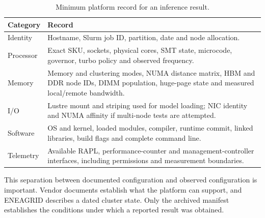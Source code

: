 \begin{table}[tbp]
\centering
\small
\caption{Minimum platform record for an inference result.}
\label{tab:platform-record}
\begin{tabularx}{\textwidth}{@{}lY@{}}
\toprule
\textbf{Category} & \textbf{Record} \\
\midrule
Identity
 & Hostname, Slurm job ID, partition, date and node allocation. \\
Processor
 & Exact SKU, sockets, physical cores, SMT state, microcode, governor,
   turbo policy and observed frequency. \\
Memory
 & Memory and clustering modes, NUMA distance matrix, HBM and DDR
   node IDs, DIMM population, huge-page state and measured local/remote
   bandwidth. \\
I/O
 & Lustre mount and striping used for model loading; NIC identity and
   NUMA affinity if multi-node tests are attempted. \\
Software
 & OS and kernel, loaded modules, compiler, runtime commit, linked
   libraries, build flags and complete command line. \\
Telemetry
 & Available RAPL, performance-counter and management-controller
   interfaces, including permissions and measurement boundaries. \\
\bottomrule
\end{tabularx}
\end{table}

This separation between documented configuration and observed
configuration is important.  Vendor documents establish what the
platform can support, and ENEAGRID describes a dated cluster state.
Only the archived manifest establishes the conditions under which a
reported result was obtained.
